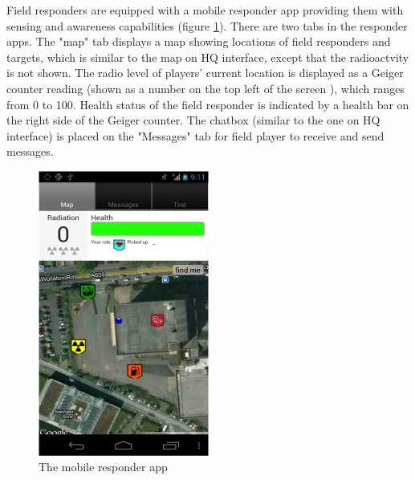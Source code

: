 Field responders are equipped with a mobile responder app providing them with sensing and awareness capabilities (figure \ref{fig:mobileResponderApp}). There are two tabs in the responder apps. The "map" tab displays a map showing locations of field responders and targets, which is similar to the map on HQ interface, except that the radioactvity is not shown. The radio level of players' current location is displayed as a Geiger counter reading (shown as a number on the top left of the screen ), which ranges from 0 to 100. Health status of the field responder is indicated by a health bar on the right side of the Geiger counter. The chatbox (similar to the one on HQ interface) is placed on the "Messages" tab for field player to receive and send messages.\\


\begin{figure}[h]
  \centering
  \includegraphics[width=0.5\textwidth]{img/study1/mobileinterface}
  \caption{The mobile responder app}
  \label{fig:mobileResponderApp}
\end{figure}




